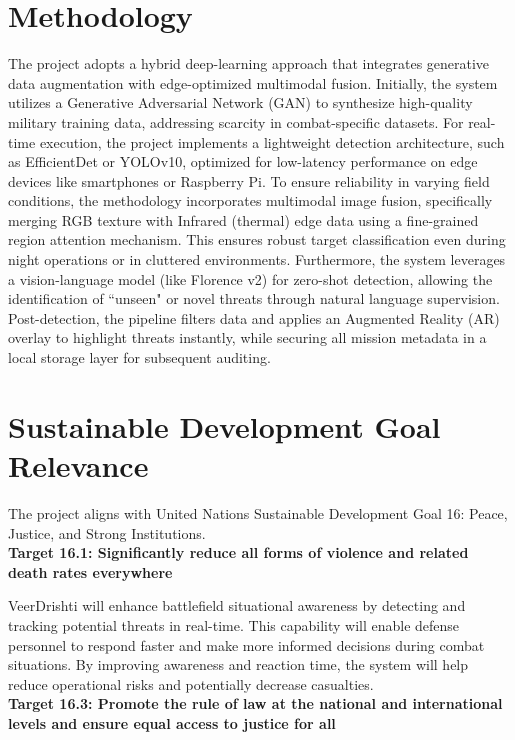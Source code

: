 \section{Methodology}
The project adopts a hybrid deep-learning approach that integrates generative data augmentation with edge-optimized multimodal fusion. Initially, the system utilizes a Generative Adversarial Network (GAN) to synthesize high-quality military training data, addressing scarcity in combat-specific datasets. For real-time execution, the project implements a lightweight detection architecture, such as EfficientDet or YOLOv10, optimized for low-latency performance on edge devices like smartphones or Raspberry Pi. To ensure reliability in varying field conditions, the methodology incorporates multimodal image fusion, specifically merging RGB texture with Infrared (thermal) edge data using a fine-grained region attention mechanism. This ensures robust target classification even during night operations or in cluttered environments. Furthermore, the system leverages a vision-language model (like Florence v2) for zero-shot detection, allowing the identification of ``unseen" or novel threats through natural language supervision. Post-detection, the pipeline filters data and applies an Augmented Reality (AR) overlay to highlight threats instantly, while securing all mission metadata in a local storage layer for subsequent auditing.

\section{Sustainable Development Goal Relevance}
The project aligns with United Nations Sustainable Development Goal 16: Peace, Justice, and Strong Institutions. \\

\textbf{Target 16.1: Significantly reduce all forms of violence and related death rates everywhere} \vspace{3pt}

VeerDrishti will enhance battlefield situational awareness by detecting and tracking potential threats in real-time. This capability will enable defense personnel to respond faster and make more informed decisions during combat situations. By improving awareness and reaction time, the system will help reduce operational risks and potentially decrease casualties. \\

\textbf{Target 16.3: Promote the rule of law at the national and international levels and ensure equal access to justice for all} \vspace{3pt}

